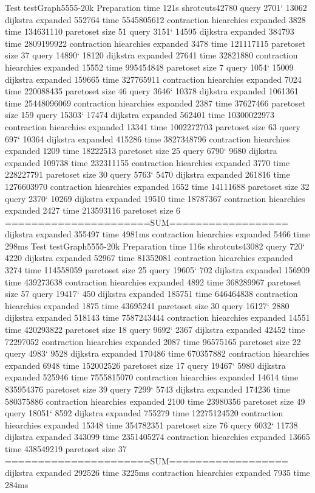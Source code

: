 Test testGraph5555-20k
Preparation time 121s shrotcuts42780
query 2701` 13062
 dijkstra expanded 552764 time 5545805612
 contraction hiearchies expanded 3828 time 134631110
 paretoset size 51
query 3151` 14595
 dijkstra expanded 384793 time 2809199922
 contraction hiearchies expanded 3478 time 121117115
 paretoset size 37
query 14890` 18120
 dijkstra expanded 27641 time 32821880
 contraction hiearchies expanded 15552 time 995454848
 paretoset size 7
query 1054` 15009
 dijkstra expanded 159665 time 327765911
 contraction hiearchies expanded 7024 time 220088435
 paretoset size 46
query 3646` 10378
 dijkstra expanded 1061361 time 25448096069
 contraction hiearchies expanded 2387 time 37627466
 paretoset size 159
query 15303` 17474
 dijkstra expanded 562401 time 10300022973
 contraction hiearchies expanded 13341 time 1002272703
 paretoset size 63
query 697` 10364
 dijkstra expanded 415286 time 3827348796
 contraction hiearchies expanded 1209 time 18222513
 paretoset size 25
query 6790` 9680
 dijkstra expanded 109738 time 232311155
 contraction hiearchies expanded 3770 time 228227791
 paretoset size 30
query 5763` 5470
 dijkstra expanded 261816 time 1276603970
 contraction hiearchies expanded 1652 time 14111688
 paretoset size 32
query 2370` 10269
 dijkstra expanded 19510 time 18787367
 contraction hiearchies expanded 2427 time 213593116
 paretoset size 6
======================SUM==================
dijkstra expanded 355497 time 4981ms
contraction hiearchies expanded 5466 time 298ms
Test testGraph5555-20k
Preparation time 116s shrotcuts43082
query 720` 4220
 dijkstra expanded 52967 time 81352081
 contraction hiearchies expanded 3274 time 114558059
 paretoset size 25
query 19605` 702
 dijkstra expanded 156909 time 439273638
 contraction hiearchies expanded 4892 time 368289967
 paretoset size 57
query 19417` 450
 dijkstra expanded 185751 time 646464838
 contraction hiearchies expanded 1875 time 43695241
 paretoset size 30
query 16127` 2880
 dijkstra expanded 518143 time 7587243444
 contraction hiearchies expanded 14551 time 420293822
 paretoset size 18
query 9692` 2367
 dijkstra expanded 42452 time 72297052
 contraction hiearchies expanded 2087 time 96575165
 paretoset size 22
query 4983` 9528
 dijkstra expanded 170486 time 670357882
 contraction hiearchies expanded 6948 time 152002526
 paretoset size 17
query 19467` 5980
 dijkstra expanded 525946 time 7555815070
 contraction hiearchies expanded 14614 time 835954376
 paretoset size 39
query 7299` 5743
 dijkstra expanded 174236 time 580375886
 contraction hiearchies expanded 2100 time 23980356
 paretoset size 49
query 18051` 8592
 dijkstra expanded 755279 time 12275124520
 contraction hiearchies expanded 15348 time 354782351
 paretoset size 76
query 6032` 11738
 dijkstra expanded 343099 time 2351405274
 contraction hiearchies expanded 13665 time 438549219
 paretoset size 37
======================SUM==================
dijkstra expanded 292526 time 3225ms
contraction hiearchies expanded 7935 time 284ms



